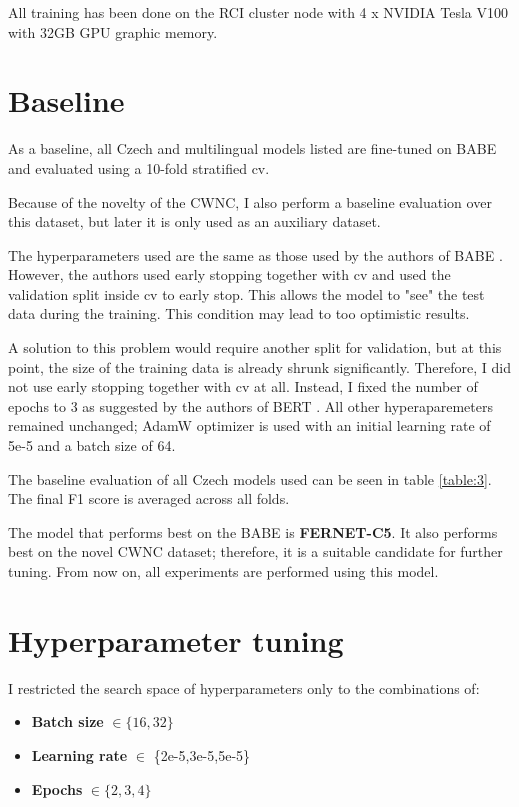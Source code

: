 All training has been done on the RCI cluster node with 4 x NVIDIA Tesla V100 with 32GB GPU graphic memory.





 \section{Baseline}
 As a baseline, all Czech and multilingual models listed are fine-tuned on BABE and evaluated using a 10-fold stratified \gls{cv}. 
 
 Because of the novelty of the CWNC, I also perform a baseline evaluation over this dataset, but later it is only used as an auxiliary dataset.
 
 The hyperparameters used are the same as those used by the authors of BABE \cite{Spinde2021MBIC}. However, the authors used early stopping together with \gls{cv} and used the validation split inside \gls{cv} to early stop. This allows the model to "see" the test data during the training. This condition may lead to too optimistic results.
 
 A solution to this problem would require another split for validation, but at this point, the size of the training data is already shrunk significantly. Therefore, I did not use early stopping together with \gls{cv} at all. Instead, I fixed the number of epochs to 3 as suggested by the authors of BERT \cite{devlin2019bert} . 
 All other hyperaparemeters remained unchanged; AdamW optimizer is used with an initial learning rate of 5e-5 and a batch size of 64.
 
 The baseline evaluation of all Czech models used can be seen in table \ref{table:3}. The final F1 score is averaged across all folds.
 
 The model that performs best on the BABE is \textbf{FERNET-C5}. It also performs best on the novel CWNC dataset; therefore, it is a suitable candidate for further tuning. From now on, all experiments are performed using this model.
 

 

 
 
 
 
 \section{Hyperparameter tuning}
I restricted the search space of hyperparameters only to the combinations of:
 \begin{itemize}
     \item \textbf{Batch size} $\in \{16,32\}$
     \item \textbf{Learning rate} $\in $ \{2e-5,3e-5,5e-5\}
     \item \textbf{Epochs} $\in \{2,3,4\}$
 \end{itemize}
 
